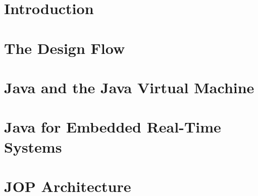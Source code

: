 



%






\frontmatter \pagestyle{empty}



\pagestyle{scrheadings}

\tableofcontents \cleardoublepage

\mainmatter


\chapter{Introduction}
\label{chap:intro}
    






\chapter{The Design Flow}
\label{chap:build}




\chapter{Java and the Java Virtual Machine}
\label{chap:java}


\chapter{Java for Embedded Real-Time Systems}

\label{chap:rtjava}
    

\chapter{JOP Architecture}
\label{chap:arch}

    
    
\clearpage %
    

